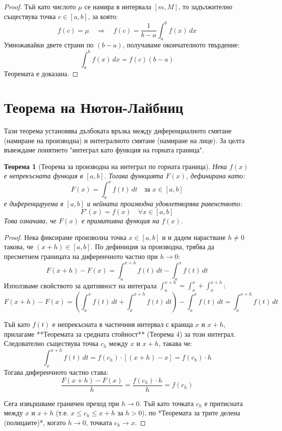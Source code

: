 \documentclass{scrartcl}
\newtheorem{theorem}{Теорема}
\begin{document}
\begin{FlushLeft}
\begin{proof}
Тъй като числото $\mu$ се намира в интервала $[m, M]$, то задължително съществува точка $c \in [a, b]$, за която:
\[ f(c) = \mu \quad \Rightarrow \quad f(c) = \frac{1}{b - a}\int_{a}^{b} f(x)\,dx \]
Умножавайки двете страни по $(b - a)$, получаваме окончателното твърдение:
\[ \int_{a}^{b} f(x)\,dx = f(c)(b - a) \]
Теоремата е доказана.
\end{proof}

\newpage

\section{Теорема на Нютон-Лайбниц}

Тази теорема установява дълбоката връзка между диференциалното смятане (намиране на производна) и интегралното смятане (намиране на лице). За целта въвеждаме понятието "интеграл като функция на горната граница".

\begin{theorem}[Теорема за производна на интеграл по горната граница]
Нека $f(x)$ е непрекъсната функция в $[a, b]$. Тогава функцията $F(x)$, дефинирана като:
\[ F(x) = \int_{a}^{x} f(t)\,dt \quad \text{за } x \in [a, b] \]
е диференцируема в $[a, b]$ и нейната производна удовлетворява равенството:
\[ F'(x) = f(x) \quad \forall x \in [a, b] \]
Това означава, че $F(x)$ е примитивна функция на $f(x)$.
\end{theorem}

\begin{proof}
Нека фиксираме произволна точка $x \in [a, b]$ и и дадем нарастване $h \neq 0$ такова, че $(x + h) \in [a, b]$. По дефиниция за производна, трябва да пресметнем границата на диференчното частно при $h \to 0$:
\[ F(x + h) - F(x) = \int_{a}^{x+h} f(t)\,dt - \int_{a}^{x} f(t)\,dt \]
Използваме свойството за адитивност на интеграла $\int_{a}^{x+h} = \int_{a}^{x} + \int_{x}^{x+h}$:
\[ F(x + h) - F(x) = \left( \int_{a}^{x} f(t)\,dt + \int_{x}^{x+h} f(t)\,dt \right) - \int_{a}^{x} f(t)\,dt = \int_{x}^{x+h} f(t)\,dt \]

Тъй като $f(t)$ е непрекъсната в частичния интервал с краища $x$ и $x+h$, прилагаме **Теоремата за средната стойност** (Теорема 4) за този интеграл. Следователно съществува точка $c_h$ между $x$ и $x+h$, такава че:
\[ \int_{x}^{x+h} f(t)\,dt = f(c_h) \cdot \left[ (x + h) - x \right] = f(c_h) \cdot h \]
Тогава диференчното частно става:
\[ \frac{F(x + h) - F(x)}{h} = \frac{f(c_h) \cdot h}{h} = f(c_h) \]

Сега извършваме граничен преход при $h \to 0$. Тъй като точката $c_h$ е притисната между $x$ и $x+h$ (т.е. $x \le c_h \le x+h$ за $h>0$), по *Теоремата за трите делена (полицаите)*, когато $h \to 0$, точката $c_h \to x$.


\end{proof}
\end{FlushLeft}
\end{document}
